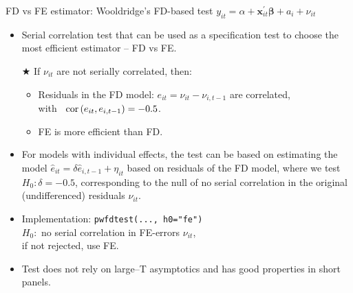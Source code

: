 \documentclass[usenames,dvipsnames]{beamer}
\begin{document}
\begin{frame}{FD vs FE estimator: Wooldridge's FD-based test}
\small
$y_{it} = \alpha + \bm{x}^{\prime}_{it} \bm{\beta} + a_i + \nu_{it}$\\ \medskip
\begin{itemize}
    \item Serial correlation test that can be used as a specification test to choose the most efficient estimator -- FD vs FE.
    \item[$\bigstar$] If $\nu_{it}$ are not serially correlated, then: 
    \begin{itemize}
          \item Residuals in the FD model: $e_{it} = \nu_{it}-\nu_{i,t-1}$ are correlated, \\with~ $\textnormal{cor}\left(e_{it},e_{i,t-1}\right)=-0.5$.
          \item FE is more efficient than FD.
        \end{itemize}
        \item For models with individual effects, the test can be based on estimating the model $\hat{e}_{it}=\delta \hat{e}_{i,t-1}+\eta_{it}$ based on residuals of the FD model, where we test $H_0: \delta=-0.5$, corresponding to the null of no serial correlation in the original (undifferenced) residuals $\nu_{it}$. 
        \medskip
        \item Implementation: \texttt{pwfdtest(..., h0="fe")} \\
        $H_0:$ no serial correlation in FE-errors $\nu_{it}$, \\if not rejected, use FE.
        \medskip
        \item Test does not rely on large–T asymptotics and has good properties in short panels.
\end{itemize}
\end{frame}
\end{document}

